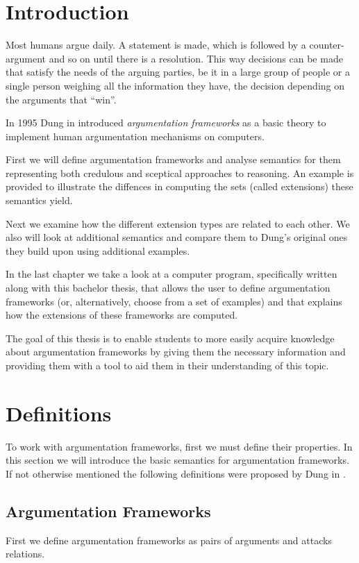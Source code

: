 \documentclass[draft,final]{vutinfth} %
\newcommand{\hl}{\par\vspace{6pt}} %
\newcommand{\cl}{\par\vspace{12pt}} %
\begin{document}
\chapter{Introduction}
Most humans argue daily. A statement is made, which is followed by a counter-argument and so on until there is a resolution. This way decisions can be made that satisfy the needs of the arguing parties, be it in a large group of people or a single person weighing all the information they have, the decision depending on the arguments that ``win''.\hl
In 1995 Dung in \cite{Dung} introduced \emph{argumentation frameworks} as a basic theory to implement human argumentation mechanisms on computers.\cl
First we will define argumentation frameworks and analyse semantics for them representing both credulous and sceptical approaches to reasoning. An example is provided to illustrate the diffences in computing the sets (called extensions) these semantics yield.\hl
Next we examine how the different extension types are related to each other. We also will look at additional semantics and compare them to Dung's original ones they build upon using additional examples.\hl
In the last chapter we take a look at a computer program, specifically written along with this bachelor thesis, that allows the user to define argumentation frameworks (or, alternatively, choose from a set of examples) and that explains how the extensions of these frameworks are computed.\cl %
The goal of this thesis is to enable students to more easily acquire knowledge about argumentation frameworks by giving them the necessary information and providing them with a tool to aid them in their understanding of this topic.

\chapter{Definitions}

To work with argumentation frameworks, first we must define their properties. In this section we will introduce the basic semantics for argumentation frameworks. If not otherwise mentioned the following definitions were proposed by Dung in \cite{Dung}.\cl

\section{Argumentation Frameworks}

First we define argumentation frameworks as pairs of arguments and attacks relations.\hl
\end{document}
